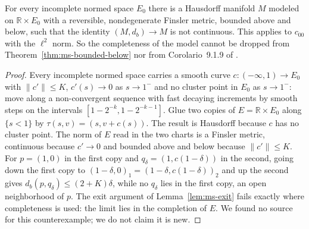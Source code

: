 \begin{theorem}
  \label{thm:ms-incomplete-counterexample}
  \leanok
  For every incomplete normed space $E_0$ there is a Hausdorff manifold $M$ modeled on
  $\mathbb{R} \times E_0$ with a reversible, nondegenerate Finsler metric, bounded above and below,
  such that the identity $(M, d_b) \to M$ is not continuous. This applies to $c_{00}$ with the
  $\ell^2$ norm. So the completeness of the model cannot be dropped from
  Theorem~\ref{thm:ms-bounded-below} nor from Corolario~9.1.9 of \cite{Lar26}.
\end{theorem}

\begin{proof}
  \leanok
  Every incomplete normed space carries a smooth curve $c \colon (-\infty, 1) \to E_0$ with
  $\|c'\| \le K$, $c'(s) \to 0$ as $s \to 1^-$ and no cluster point in $E_0$ as $s \to 1^-$: move
  along a non-convergent sequence with fast decaying increments by smooth steps on the intervals
  $[1 - 2^{-k}, 1 - 2^{-k-1}]$. Glue two copies of $E = \mathbb{R} \times E_0$ along
  $\{s < 1\}$ by $\tau(s, v) = (s, v + c(s))$. The result is Hausdorff because $c$ has no cluster
  point. The norm of $E$ read in the two charts is a Finsler metric, continuous because
  $c' \to 0$ and bounded above and below because $\|c'\| \le K$. For $p = (1, 0)$ in the first
  copy and $q_\delta = (1, c(1 - \delta))$ in the second, going down the first copy to
  $(1 - \delta, 0)_1 = (1 - \delta, c(1 - \delta))_2$ and up the second gives
  $d_b(p, q_\delta) \le (2 + K)\delta$, while no $q_\delta$ lies in the first copy, an open
  neighborhood of $p$. The exit argument of Lemma~\ref{lem:ms-exit} fails exactly where
  completeness is used: the limit lies in the completion of $E$. We found no source for this
  counterexample; we do not claim it is new.
\end{proof}

